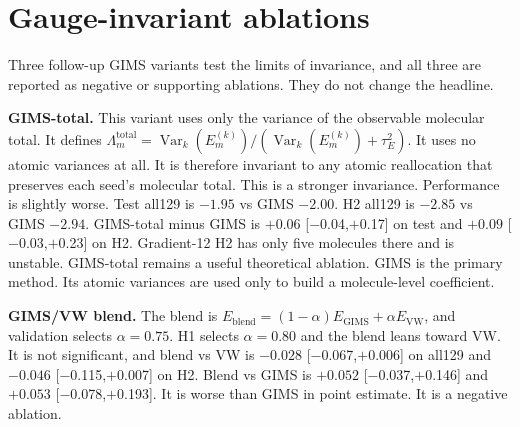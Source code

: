 \documentclass{article}
\begin{document}
\section{Gauge-invariant ablations}
\label{app:gims-ablations}

Three follow-up GIMS variants test the limits of invariance, and all three are reported as
negative or supporting ablations. They do not change the headline.

\textbf{GIMS-total.} This variant uses only the variance of the observable
molecular total. It defines $\Lambda_m^{\mathrm{total}}=
\operatorname{Var}_k(E_m^{(k)})/(\operatorname{Var}_k(E_m^{(k)})+\tau_E^2)$.
It uses no atomic variances at all. It is therefore invariant to any atomic
reallocation that preserves each seed's molecular total. This is a stronger
invariance. Performance is slightly worse. Test all129 is $-1.95$ vs GIMS
$-2.00$. H2 all129 is $-2.85$ vs GIMS $-2.94$. GIMS-total minus GIMS is
$+0.06$ [$-$0.04,$+$0.17] on test and $+0.09$ [$-$0.03,$+$0.23] on H2. Gradient-12
H2 has only five molecules there and is unstable. GIMS-total remains a useful
theoretical ablation. GIMS is the primary method. Its atomic variances are
used only to build a molecule-level coefficient.

\textbf{GIMS/VW blend.} The blend is $E_{\mathrm{blend}}=(1-\alpha)E_{\mathrm{GIMS}}+
\alpha E_{\mathrm{VW}}$, and validation selects $\alpha=0.75$. H1 selects
$\alpha=0.80$ and the blend leans toward VW. It is not significant, and blend vs VW
is $-0.028$ [$-$0.067,$+$0.006] on all129 and $-0.046$ [$-$0.115,$+$0.007] on H2.
Blend vs GIMS is $+0.052$ [$-$0.037,$+$0.146] and $+0.053$ [$-$0.078,$+$0.193].
It is worse than GIMS in point estimate. It is a negative ablation.
\end{document}
